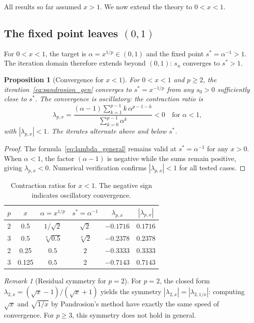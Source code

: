 \documentclass[10pt,a4paper,oneside]{book}
\newtheorem{proposition}[theorem]{Proposition}
\theoremstyle{definition}
\theoremstyle{remark}
\newtheorem{remark}[theorem]{Remark}
\newcommand{\cbrt}[1]{\sqrt[3]{#1}}
\begin{document}
All results so far assumed $x > 1$. We now extend the theory to $0 < x < 1$.

\subsection{The fixed point leaves $(0,1)$}

For $0 < x < 1$, the target is $\alpha = x^{1/p} \in (0,1)$ and the fixed point $s^* = \alpha^{-1} > 1$. The iteration domain therefore extends beyond $(0,1)$: $s_n$ converges to $s^* > 1$.

\begin{proposition}[Convergence for $x < 1$]
\label{prop:x_small}
For $0 < x < 1$ and $p \geq 2$, the iteration~\eqref{eq:pandrosion_gen} converges to $s^* = x^{-1/p}$ from any $s_0 > 0$ sufficiently close to $s^*$. The convergence is \emph{oscillatory}: the contraction ratio is
\[
  \lambda_{p,x} = \frac{(\alpha - 1)\sum_{k=1}^{p-1}k\,\alpha^{p-1-k}}{\sum_{k=0}^{p-1}\alpha^k} < 0 \quad \text{for } \alpha < 1,
\]
with $|\lambda_{p,x}| < 1$. The iterates alternate above and below $s^*$.
\end{proposition}

\begin{proof}
The formula~\eqref{eq:lambda_general} remains valid at $s^* = \alpha^{-1}$ for any $x > 0$. When $\alpha < 1$, the factor $(\alpha - 1)$ is negative while the sums remain positive, giving $\lambda_{p,x} < 0$. Numerical verification confirms $|\lambda_{p,x}| < 1$ for all tested cases.
\end{proof}

\begin{table}[h]
\centering
\begin{tabular}{cccccc}
\toprule
$p$ & $x$ & $\alpha = x^{1/p}$ & $s^* = \alpha^{-1}$ & $\lambda_{p,x}$ & $|\lambda_{p,x}|$ \\
\midrule
2 & 0.5 & $1/\sqrt{2}$ & $\sqrt{2}$ & $-0.1716$ & $0.1716$ \\
3 & 0.5 & $\cbrt{0.5}$ & $\cbrt{2}$ & $-0.2378$ & $0.2378$ \\
2 & 0.25 & $0.5$ & $2$ & $-0.3333$ & $0.3333$ \\
3 & 0.125 & $0.5$ & $2$ & $-0.7143$ & $0.7143$ \\
\bottomrule
\end{tabular}
\caption{Contraction ratios for $x < 1$. The negative sign indicates oscillatory convergence.}
\end{table}

\begin{remark}[Residual symmetry for $p=2$]
For $p = 2$, the closed form $\lambda_{2,x} = (\sqrt{x}-1)/(\sqrt{x}+1)$ yields the symmetry $|\lambda_{2,x}| = |\lambda_{2,1/x}|$: computing $\sqrt{x}$ and $\sqrt{1/x}$ by Pandrosion's method have exactly the same speed of convergence. For $p \geq 3$, this symmetry does not hold in general.
\end{remark}
\end{document}

